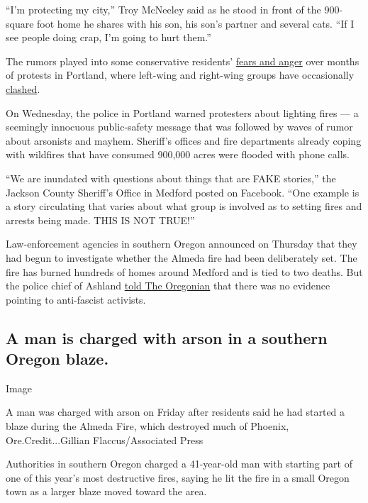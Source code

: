 ``I'm protecting my city,'' Troy McNeeley said as he stood in front of
the 900-square foot home he shares with his son, his son's partner and
several cats. ``If I see people doing crap, I'm going to hurt them.''

The rumors played into some conservative residents'
\href{https://www.nytimes3xbfgragh.onion/2020/09/05/us/portland-political-chasm-protests-unrest.html}{fears
and anger} over months of protests in Portland, where left-wing and
right-wing groups have occasionally
\href{https://www.nytimes3xbfgragh.onion/2020/08/22/us/portland-protests.html}{clashed}.

On Wednesday, the police in Portland warned protesters about lighting
fires --- a seemingly innocuous public-safety message that was followed
by waves of rumor about arsonists and mayhem. Sheriff's offices and fire
departments already coping with wildfires that have consumed 900,000
acres were flooded with phone calls.

``We are inundated with questions about things that are FAKE stories,''
the Jackson County Sheriff's Office in Medford posted on Facebook. ``One
example is a story circulating that varies about what group is involved
as to setting fires and arrests being made. THIS IS NOT TRUE!''

Law-enforcement agencies in southern Oregon announced on Thursday that
they had begun to investigate whether the Almeda fire had been
deliberately set. The fire has burned hundreds of homes around Medford
and is tied to two deaths. But the police chief of Ashland
\href{https://www.oregonlive.com/crime/2020/09/arson-investigation-underway-where-human-remains-found-at-almeda-fire-in-ashland-chief-says.html}{told
The Oregonian} that there was no evidence pointing to anti-fascist
activists.

\hypertarget{a-man-is-charged-with-arson-in-a-southern-oregon-blaze}{%
\subsection{A man is charged with arson in a southern Oregon
blaze.}\label{a-man-is-charged-with-arson-in-a-southern-oregon-blaze}}

Image

A man was charged with arson on Friday after residents said he had
started a blaze during the Almeda Fire, which destroyed much of Phoenix,
Ore.Credit...Gillian Flaccus/Associated Press

Authorities in southern Oregon charged a 41-year-old man with starting
part of one of this year's most destructive fires, saying he lit the
fire in a small Oregon town as a larger blaze moved toward the area.

